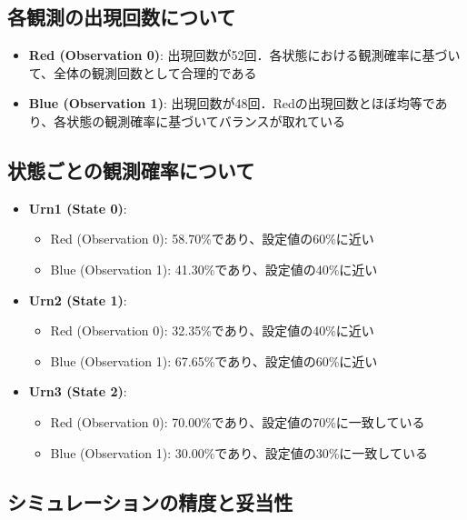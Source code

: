 \documentclass[dvipdfmx,titlepage,a4j]{jsarticle}
\begin{document}
\subsection{各観測の出現回数について}

\begin{itemize}
    \item \textbf{Red (Observation 0)}: 出現回数が52回．各状態における観測確率に基づいて、全体の観測回数として合理的である
    \item \textbf{Blue (Observation 1)}: 出現回数が48回．Redの出現回数とほぼ均等であり、各状態の観測確率に基づいてバランスが取れている
\end{itemize}

\subsection{状態ごとの観測確率について}

\begin{itemize}
    \item \textbf{Urn1 (State 0)}:
          \begin{itemize}
              \item Red (Observation 0): 58.70\%であり、設定値の60\%に近い
              \item Blue (Observation 1): 41.30\%であり、設定値の40\%に近い
          \end{itemize}
    \item \textbf{Urn2 (State 1)}:
          \begin{itemize}
              \item Red (Observation 0): 32.35\%であり、設定値の40\%に近い
              \item Blue (Observation 1): 67.65\%であり、設定値の60\%に近い
          \end{itemize}
    \item \textbf{Urn3 (State 2)}:
          \begin{itemize}
              \item Red (Observation 0): 70.00\%であり、設定値の70\%に一致している
              \item Blue (Observation 1): 30.00\%であり、設定値の30\%に一致している
          \end{itemize}
\end{itemize}

\subsection{シミュレーションの精度と妥当性}
\end{document}
